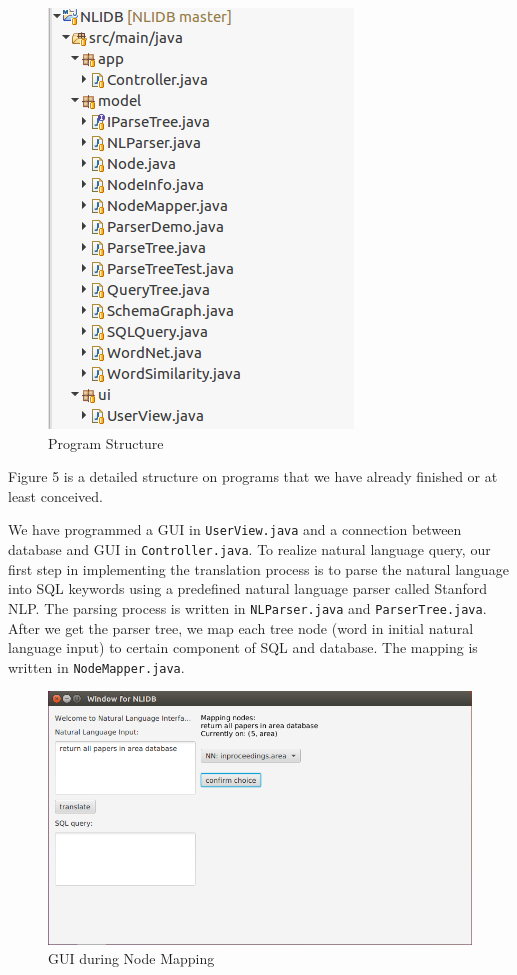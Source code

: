 \documentclass[twocolumn]{article}
\begin{document}
\begin{figure}[ht]
	\centerline{\includegraphics[width=0.8\linewidth]{figures/program_structure.png}}
	\caption{Program Structure}
\end{figure}
Figure 5 is a detailed structure on programs that we have already finished or at least conceived.

We have programmed a GUI in \texttt{UserView.java} and a connection between database and GUI in \texttt{Controller.java}. To realize natural language query, our first step in implementing the translation process is to parse the natural language into SQL keywords using a predefined natural language parser called Stanford NLP. The parsing process is written in \texttt{NLParser.java} and \texttt{ParserTree.java}. After we get the parser tree, we map each tree node (word in initial natural language input) to certain component of SQL and database. The mapping is written in \texttt{NodeMapper.java}.

\begin{figure}[ht]
	\centerline{\includegraphics[width=0.7\linewidth]{figures/gui_nodes_mapping.png}}
	\caption{GUI during Node Mapping}
\end{figure}
\end{document}
